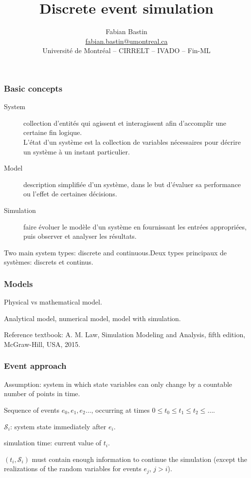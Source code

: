 \documentclass[t,usepdftitle=false]{beamer}
\title[Simulation]{Discrete event simulation}
\author[Fabian Bastin]{Fabian Bastin \\ \url{fabian.bastin@umontreal.ca} \\ Université de Montréal -- CIRRELT -- IVADO -- Fin-ML}
\date{}
\def\cS{\mathcal{S}}
\begin{document}
\frame{\titlepage}

\begin{frame}
	\frametitle{Basic concepts}
	
	\begin{description}
		\item[System]
		collection d'entités qui agissent et interagissent afin d'accomplir une certaine fin logique.\\
		L'état d'un système est la collection de variables nécessaires pour décrire un système à un instant particulier.
		\item[Model]
		description simplifiée d'un système, dans le but d'évaluer sa performance ou l'effet de certaines décisions.
		\item[Simulation]
		faire évoluer le modèle d'un système en fournissant les entrées appropriées, puis observer et analyser les résultats.
	\end{description}
	
	\mbox{}
	
	Two main system types: discrete and continuous.Deux types principaux de systèmes: discrets et continus.
	
\end{frame}

\begin{frame}
	\frametitle{Models}
	
	Physical vs mathematical model.
	
	\mbox{}
	
	Analytical model, numerical model, model with simulation.

\mbox{}

Reference textbook: 
A. M. Law, Simulation Modeling and Analysis, fifth edition, McGraw-Hill, USA, 2015.

\end{frame}

\begin{frame}
\frametitle{Event approach}

Assumption: system in which state variables can only change by a countable number of points in time.

\mbox{}

Sequence of events $e_0, e_1, e_2\ldots$, occurring at times $0 \leq t_0 \leq t_1 \leq t_2 \leq \ldots$. 

\mbox{}

${\cS_i}$: system state immediately after ${e_i}$.

\mbox{}

simulation time: current value of ${t_i}$.

\mbox{}

$(t_i,\cS_i)$ must contain enough information to continue the simulation (except the realizations of the random variables for events $e_j$, $j > i$).

\end{frame}
\end{document}
